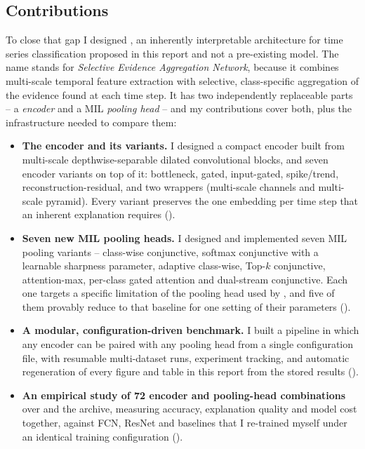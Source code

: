 \subsection{Contributions}
\label{sec:intro:contrib}

To close that gap I designed \seanet{}, an inherently interpretable architecture for time series
classification proposed in this report and not a pre-existing model. The name stands for
\emph{Selective Evidence Aggregation Network}, because it combines multi-scale temporal feature
extraction with selective, class-specific aggregation of the evidence found at each time step. It
has two independently replaceable parts -- a \seanet{} \emph{encoder} and a MIL \emph{pooling head}
-- and my contributions cover both, plus the infrastructure needed to compare them:

\begin{contribution}
\begin{itemize}\itemsep3pt
  \item \textbf{The \seanet{} encoder and its variants.} I designed a compact encoder built from
        multi-scale depthwise-separable dilated convolutional blocks, and seven \seanet{} encoder
        variants on top of it: bottleneck, gated, input-gated, spike/trend, reconstruction-residual,
        and two wrappers (multi-scale channels and multi-scale pyramid). Every variant preserves the
        one embedding per time step that an inherent explanation requires
        ().

  \item \textbf{Seven new MIL pooling heads.} I designed and implemented seven MIL pooling
        variants -- class-wise conjunctive, softmax conjunctive with a learnable sharpness
        parameter, adaptive class-wise, Top-$k$ conjunctive, attention-max, per-class gated
        attention and dual-stream conjunctive. Each one targets a specific limitation of the
        pooling head used by \millet{}, and five of them provably reduce to that baseline for one
        setting of their parameters ().

  \item \textbf{A modular, configuration-driven benchmark.} I built a pipeline in which any encoder
        can be paired with any pooling head from a single configuration file, with resumable
        multi-dataset runs, experiment tracking, and automatic regeneration of every figure and
        table in this report from the stored results ().

  \item \textbf{An empirical study of 72 encoder and pooling-head combinations} over \webtraffic{}
        and the \ucr{} archive, measuring accuracy, explanation quality and model cost together,
        against FCN, ResNet and \millet{} baselines that I re-trained myself under an identical
        training configuration ().
\end{itemize}
\end{contribution}

